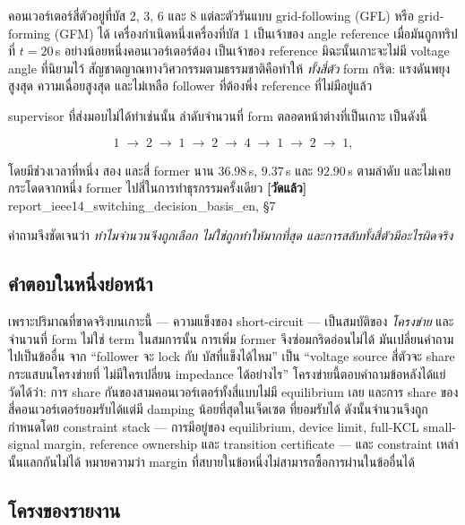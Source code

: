 \documentclass[12pt,a4paper]{article}
\theoremstyle{remark}
\newcommand{\code}[1]{{\ttfamily\small\hyphenchar\font=-1 #1}}
\newcommand{\measured}{\textcolor{ok}{\textbf{[วัดแล้ว]}}}
\begin{document}
คอนเวอร์เตอร์สี่ตัวอยู่ที่บัส 2, 3, 6 และ 8 แต่ละตัวรันแบบ grid-following (GFL)
หรือ grid-forming (GFM) ได้ เครื่องกำเนิดหนึ่งเครื่องที่บัส 1 เป็นเจ้าของ
angle reference เมื่อมันถูกทริปที่ $t=20$\,s อย่างน้อยหนึ่งคอนเวอร์เตอร์ต้อง
เป็นเจ้าของ reference มิฉะนั้นเกาะจะไม่มี voltage angle ที่นิยามไว้
สัญชาตญาณทางวิศวกรรมตามธรรมชาติคือทำให้ \emph{ทั้งสี่ตัว} form กริด:
แรงดันพยุงสูงสุด ความเฉื่อยสูงสุด และไม่เหลือ follower ที่ต้องพึ่ง reference
ที่ไม่มีอยู่แล้ว

supervisor ที่ส่งมอบไม่ได้ทำเช่นนั้น ลำดับจำนวนที่ form ตลอดหน้าต่างที่เป็นเกาะ
เป็นดังนี้

\begin{equation}
1 \;\to\; 2 \;\to\; 1 \;\to\; 2 \;\to\; 4 \;\to\; 1 \;\to\; 2 \;\to\; 1,
\label{eq:countseq}
\end{equation}

โดยมีช่วงเวลาที่หนึ่ง สอง และสี่ former นาน $36.98$\,s, $9.37$\,s และ
$92.90$\,s ตามลำดับ และไม่เคยกระโดดจากหนึ่ง former ไปสี่ในการทำธุรกรรมครั้งเดียว
\measured{} \code{report\_ieee14\_switching\_decision\_basis\_en}, \S7

คำถามจึงชัดเจนว่า \emph{ทำไมจำนวนจึงถูกเลือก ไม่ใช่ถูกทำให้มากที่สุด
และการสลับทั้งสี่ตัวมีอะไรผิดจริง}

\subsection{คำตอบในหนึ่งย่อหน้า}

เพราะปริมาณที่ขาดจริงบนเกาะนี้ --- ความแข็งของ short-circuit --- เป็นสมบัติของ
\emph{โครงข่าย} และจำนวนที่ form ไม่ใช่ term ในสมการนั้น การเพิ่ม former
จึงซ่อมกริดอ่อนไม่ได้ มันเปลี่ยนคำถามไปเป็นข้ออื่น จาก ``follower จะ lock กับ
บัสที่แข็งได้ไหม'' เป็น ``voltage source สี่ตัวจะ share กระแสบนโครงข่ายที่
ไม่มีใครเปลี่ยน impedance ได้อย่างไร'' โครงข่ายนี้ตอบคำถามข้อหลังได้แย่
วัดได้ว่า: การ share กันของสามคอนเวอร์เตอร์ทั้งสี่แบบไม่มี equilibrium เลย
และการ share ของสี่คอนเวอร์เตอร์ยอมรับได้แต่มี damping น้อยที่สุดในเจ็ดเซต
ที่ยอมรับได้ ดังนั้นจำนวนจึงถูกกำหนดโดย constraint stack --- การมีอยู่ของ
equilibrium, device limit, full-KCL small-signal margin, reference ownership
และ transition certificate --- และ constraint เหล่านั้นแลกกันไม่ได้ หมายความว่า
margin ที่สบายในข้อหนึ่งไม่สามารถซื้อการผ่านในข้ออื่นได้

\subsection{โครงของรายงาน}
\end{document}
